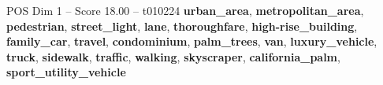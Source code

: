 \begin{textsample}{POS Dim 1 – Score 18.00 – t010224}  \label{ex:f1_pos_027}
\textbf{urban\_area}, \textbf{metropolitan\_area}, \textbf{pedestrian}, \textbf{street\_light}, \textbf{lane}, \textbf{thoroughfare}, \textbf{high-rise\_building}, \textbf{family\_car}, \textbf{travel}, \textbf{condominium}, \textbf{palm\_trees}, \textbf{van}, \textbf{luxury\_vehicle}, \textbf{truck}, \textbf{sidewalk}, \textbf{traffic}, \textbf{walking}, \textbf{skyscraper}, \textbf{california\_palm}, \textbf{sport\_utility\_vehicle}

\end{textsample}
